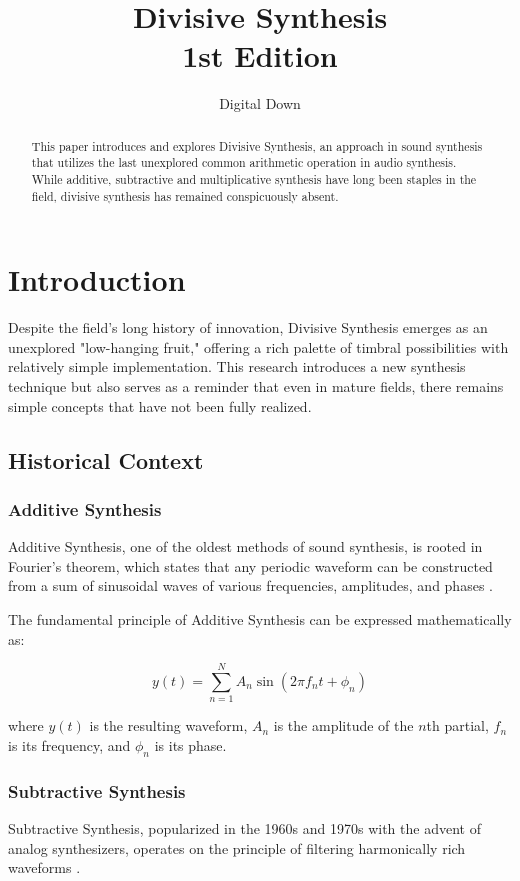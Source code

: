 \documentclass[12pt,a4paper]{article}
\title{Divisive Synthesis\\
\small{1st Edition}}
\author{Digital Down}
\begin{document}
\maketitle

\begin{abstract}
This paper introduces and explores Divisive Synthesis, an approach in sound synthesis that utilizes the last unexplored common arithmetic operation in audio synthesis. While additive, subtractive and multiplicative synthesis have long been staples in the field, divisive synthesis has remained conspicuously absent.

\end{abstract}

\section{Introduction}
 Despite the field's long history of innovation, Divisive Synthesis emerges as an unexplored "low-hanging fruit," offering a rich palette of timbral possibilities with relatively simple implementation. This research introduces a new synthesis technique but also serves as a reminder that even in mature fields, there remains simple concepts that have not been fully realized.

\subsection{Historical Context}

\subsubsection{Additive Synthesis}
Additive Synthesis, one of the oldest methods of sound synthesis, is rooted in Fourier's theorem, which states that any periodic waveform can be constructed from a sum of sinusoidal waves of various frequencies, amplitudes, and phases \cite{Additive}.

The fundamental principle of Additive Synthesis can be expressed mathematically as:

\begin{equation*}
y(t) = \sum_{n=1}^{N} A_n \sin(2\pi f_n t + \phi_n)
\end{equation*}

where $y(t)$ is the resulting waveform, $A_n$ is the amplitude of the $n$th partial, $f_n$ is its frequency, and $\phi_n$ is its phase.

\subsubsection{Subtractive Synthesis}
Subtractive Synthesis, popularized in the 1960s and 1970s with the advent of analog synthesizers, operates on the principle of filtering harmonically rich waveforms \cite{Subtractive}.
\end{document}
